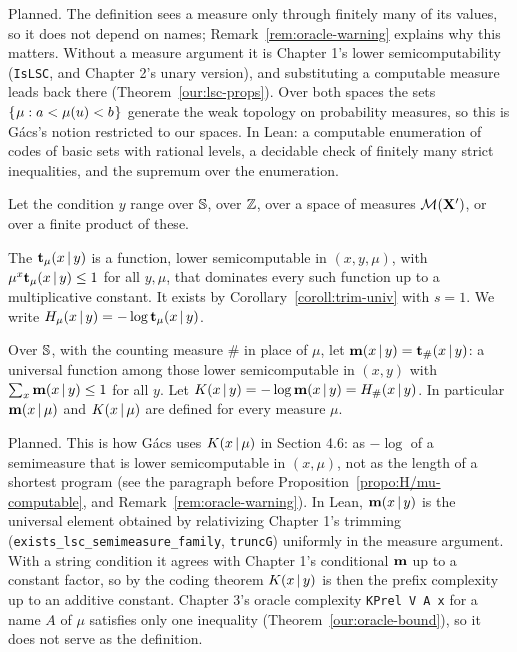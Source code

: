 \begin{formalization}
Planned. The definition sees a measure only through finitely many of its values, so it does not
depend on names; Remark~\ref{rem:oracle-warning} explains why this matters. Without a measure
argument it is Chapter 1's lower semicomputability (\texttt{IsLSC}, and Chapter 2's unary
version), and substituting a computable measure leads back there
(Theorem~\ref{our:lsc-props}). Over both spaces the sets $\mathopen\{\mskip 1mu\mu : a<\mu(u)<b\mskip 1mu\mathclose\}$ generate the
weak topology on probability measures, so this is G\'acs's notion restricted to our spaces. In
Lean: a computable enumeration of codes of basic sets with rational levels, a decidable check of
finitely many strict inequalities, and the supremum over the enumeration.
\end{formalization}

\begin{ourdefinition}\label{our:m-cond}
Let the condition \( y \) range over \( \mathbb{S} \), over \( \mathbb{Z} \), over a space of measures
\( \mathcal{M}(\mathbf{X}') \), or over a finite product of these.
 \begin{alphenum}
  \item The  \( \mathbf{t}_{\mu}(x \,\vert\, y) \) is a function, lower
semicomputable in \( (x,y,\mu) \), with \( \mu^{x}\mathbf{t}_{\mu}(x \,\vert\, y)\le 1 \) for all
\( y,\mu \), that dominates every such function up to a multiplicative constant.
It exists by Corollary~\ref{coroll:trim-univ} with \( s = 1 \).
We write \( H_{\mu}(x \,\vert\, y) = -\log\mathbf{t}_{\mu}(x \,\vert\, y) \).
  \item Over \( \mathbb{S} \), with the counting measure \( \# \) in place of \( \mu \), let
\( \mathbf{m}(x \,\vert\, y) = \mathbf{t}_{\#}(x \,\vert\, y) \): a universal function among those lower
semicomputable in \( (x,y) \) with \( \sum_{x}\mathbf{m}(x \,\vert\, y)\le 1 \) for all \( y \).
Let \( K(x \,\vert\, y) = -\log\mathbf{m}(x \,\vert\, y) = H_{\#}(x \,\vert\, y) \).
In particular \( \mathbf{m}(x \,\vert\, \mu) \) and \( K(x \,\vert\, \mu) \) are defined for every measure
\( \mu \).
 \end{alphenum}
\end{ourdefinition}

\begin{formalization}
Planned. This is how G\'acs uses $K(x \,\vert\, \mu)$ in Section 4.6: as $-\log$ of a semimeasure
that is lower semicomputable in $(x,\mu)$, not as the length of a shortest program (see the
paragraph before Proposition~\ref{propo:H/mu-computable}, and
Remark~\ref{rem:oracle-warning}). In Lean, $\mathbf{m}(x \,\vert\, y)$ is the universal element obtained by
relativizing Chapter 1's trimming (\texttt{exists\_lsc\_semimeasure\_family}, \texttt{truncG})
uniformly in the measure argument. With a string condition it agrees with Chapter 1's conditional
$\mathbf{m}$ up to a constant factor, so by the coding theorem $K(x \,\vert\, y)$ is then the prefix
complexity up to an additive constant. Chapter 3's oracle complexity \texttt{KPrel V A x} for a
name $A$ of $\mu$ satisfies only one inequality (Theorem~\ref{our:oracle-bound}), so it does not
serve as the definition.
\end{formalization}

